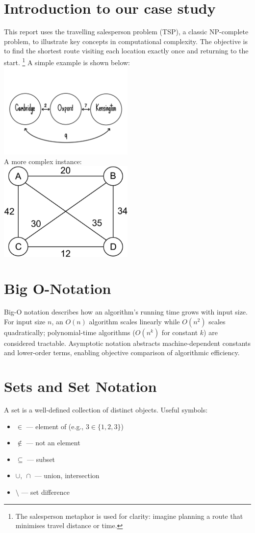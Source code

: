 \documentclass[12pt]{report}
\begin{document}
\section{Introduction to our case study}
This report uses the travelling salesperson problem (TSP), a classic NP-complete problem, to illustrate key concepts in computational complexity. The objective is to find the shortest route visiting each location exactly once and returning to the start.%
\footnote{The salesperson metaphor is used for clarity: imagine planning a route that minimises travel distance or time.}
A simple example is shown below:\\
\includegraphics[width=0.5\textwidth]{trivialTSP.png}\\
\vspace{0.5cm}
A more complex instance:\\
\includegraphics[width=0.5\textwidth]{HarderTSP.png}

\section{Big O-Notation}
Big-O notation describes how an algorithm's running time grows with input size. For input size $n$, an $O(n)$ algorithm scales linearly while $O(n^2)$ scales quadratically; polynomial-time algorithms ($O(n^k)$ for constant $k$) are considered tractable. Asymptotic notation abstracts machine-dependent constants and lower-order terms, enabling objective comparison of algorithmic efficiency.

\section{Sets and Set Notation}
A set is a well-defined collection of distinct objects. Useful symbols:
\begin{itemize}
    \item $\in$ — element of (e.g., $3\in\{1,2,3\}$)
    \item $\notin$ — not an element
    \item $\subseteq$ — subset
    \item $\cup,\ \cap$ — union, intersection
    \item $\setminus$ — set difference
\end{itemize}
\end{document}
